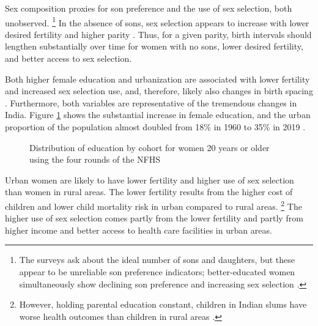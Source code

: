 \documentclass[12pt,letterpaper]{article}
\begin{document}
Sex composition proxies for son preference and the use of
sex selection, both unobserved.%
\footnote{
The surveys ask about the ideal number of sons and 
daughters, but these appear to be unreliable son 
preference indicators; better-educated women simultaneously show 
declining son preference and increasing sex selection 
\citep{bhat03,pande07}.
} 
In the absence of sons, sex selection appears to increase 
with lower desired fertility and higher parity
\citep{Portner2015b,Jayachandran2017}. 
Thus, for a given parity, birth intervals should lengthen 
substantially over time for women with no sons, lower 
desired fertility, and better access to sex selection.

Both higher female education and urbanization are associated with 
lower fertility and increased sex selection use, and, therefore, likely also changes in birth spacing
\citep{das_gupta97,retherford03b,Portner2015b}.
Furthermore, both variables are representative of
the tremendous changes in India. 
Figure \ref{fig:education_over_time} shows the substantial increase in female education,
and the urban proportion of the population almost doubled from 18\% in 1960 to 35\% in 
2019 \citep{United-Nations2019}.

\begin{figure}[htpb]
\centering
{} 
\caption{Distribution of education by cohort for women 20 years or older
using the four rounds of the NFHS}
\label{fig:education_over_time}
\end{figure}

Urban women are likely to have lower fertility and higher use of sex selection than women 
in rural areas.
The lower fertility results from the higher cost of children and lower child mortality 
risk in urban compared to rural areas.%
\footnote{
However, holding parental education constant, children in Indian slums have worse
health outcomes than children in rural areas \citep{Portner2018a}.
}
The higher use of sex selection comes partly from the lower fertility and partly from
higher income and better access to health care facilities in urban areas.
\end{document}
